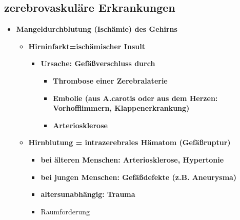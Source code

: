 \subsection{zerebrovaskuläre Erkrankungen}
	\begin{itemize}
		\item \textbf{Mangeldurchblutung (Ischämie) des Gehirns}
			\begin{itemize}
				\item \textbf{Hirninfarkt=ischämischer Insult}
					\begin{itemize}
						\item \textbf{Ursache: Gefäßverschluss durch}
							\begin{itemize}
								\item \textbf{Thrombose einer Zerebralaterie}
								\item \textbf{Embolie (aus A.carotis oder aus dem Herzen: Vorhofflimmern, Klappenerkrankung)}
								\item \textbf{Arteriosklerose}
							\end{itemize}
					\end{itemize}
				\item \textbf{Hirnblutung = intrazerebrales Hämatom (Gefäßruptur)}
					\begin{itemize}
						\item \textbf{bei älteren Menschen: Arteriosklerose, Hypertonie}
						\item \textbf{bei jungen Menschen: Gefäßdefekte (z.B. Aneurysma)}
						\item \textbf{altersunabhängig: Trauma}
						\item Raumforderung 
					\end{itemize}
			\end{itemize}
	\end{itemize}
	
